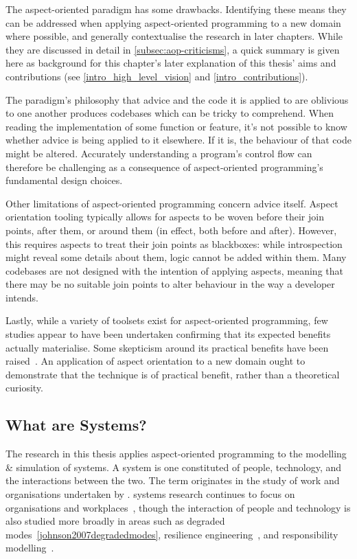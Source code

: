 
The aspect-oriented paradigm has some drawbacks. Identifying these means they
can be addressed when applying aspect-oriented programming to a new domain where
possible, and generally contextualise the research in later chapters. While they
are discussed in detail in \cref{subsec:aop-criticisms}, a quick summary is
given here as background for this chapter's later explanation of this thesis'
aims and contributions (see \cref{intro_high_level_vision} and \cref{intro_contributions}).

The paradigm's philosophy that advice and the code it is applied to are
oblivious to one another produces codebases which can be tricky to
comprehend. When reading the implementation of some function or
feature, it's not possible to know whether advice is being applied to it
elsewhere. If it is, the behaviour of that code might be altered. Accurately
understanding a program's control flow can therefore be challenging as a
consequence of aspect-oriented programming's fundamental design choices.

Other limitations of aspect-oriented programming concern advice itself. Aspect
orientation tooling typically allows for aspects to be woven before their join
points, after them, or around them (in effect, both before and after). However,
this requires aspects to treat their join points as blackboxes: while
introspection might reveal some details about them, logic cannot be added within
them. Many codebases are not designed with the intention of applying aspects,
meaning that there may be no suitable join points to alter behaviour in the way
a developer intends.

Lastly, while a variety of toolsets exist for aspect-oriented programming, few
studies appear to have been undertaken confirming that its expected benefits
actually materialise. Some skepticism around its practical benefits have been
raised~\cite{steimann06paradoxical,przybylek2010wrong,Constantinides04aopconsidered}.
An application of aspect orientation to a new domain ought to demonstrate
that the technique is of practical benefit, rather than a theoretical curiosity.



\subsection{What are \SocioTechnical Systems?}

The research in this thesis applies aspect-oriented programming to the modelling
\& simulation of \sociotechnical systems. A \sociotechnical system is one
constituted of people, technology, and the interactions between the two. The
term originates in the study of work and organisations undertaken by
\citet{trist1951sociotechnical}. \Sociotechnical systems research continues to
focus on organisations and
workplaces~\cite{pasmore2019reflections,baxter2011socio}, though the interaction
of people and technology is also studied more broadly in areas such as degraded
modes~\cref{johnson2007degradedmodes}, resilience
engineering~\cite{hollnagel2006resilience}, and responsibility
modelling~\cite{lock2009responsibility}.

